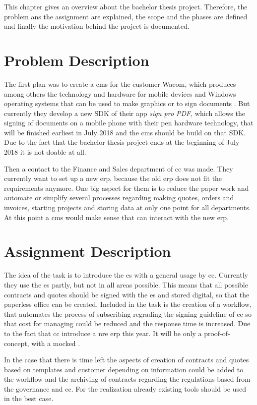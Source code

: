  This chapter gives an overview about the bachelor thesis project. Therefore, the problem ans the assignment are explained, the scope and the phases are defined and finally the motivation behind the project is documented.
 
 \section{Problem Description}
 The first plan was to create a \gls{cms} for the customer Wacom, which produces among others the technology and hardware for mobile devices and Windows operating systems that can be used to make graphics or to sign documents \parencite{wacom2018about}. But currently they develop a new \gls{SDK} of their \gls{app} \textit{sign pro PDF}, which allows the signing of documents on a mobile phone with their pen hardware technology\parencite{wacom2018sign}, that will be finished earliest in July 2018 and the \gls{cms} should be build on that \gls{SDK}. Due to the fact that the bachelor thesis project ends at the beginning of July 2018 it is not doable at all.
 
 Then a contact to the Finance and Sales department of \gls{cc} was made. They currently want to set up a new \gls{erp}, because the old \gls{erp} does not fit the requirements anymore. One big aspect for them is to reduce the paper work and automate or simplify several processes regarding making quotes, orders and invoices, starting projects and storing data at only one point for all departments. At this point a \gls{cms} would make sense that can interact with the new \gls{erp}.

 \section{Assignment Description}
 The idea of the task is to introduce the \gls{es} with a general usage by \gls{cc}. Currently they use the \gls{es} partly, but not in all areas possible.
 This means that all possible contracts and quotes should be signed with the \gls{es} and stored digital, so that the paperless office can be created. Included in the task is the creation of a workflow, that automates the process of subscribing regrading the signing guideline of \gls{cc} so that cost for managing could be reduced and the response time is increased. Due to the fact that \gls{cc} introduce a nre \gls{erp} this year. It will be only a proof-of-concept, with a mocked .
 
 In the case that there is time left the aspects of creation of contracts and quotes based on templates and customer depending on information could be added to the workflow and the archiving of contracts regarding the regulations based from the governance and \gls{cc}. For the realization already existing tools should be used in the best case.
 
